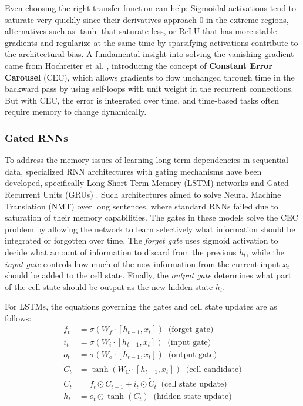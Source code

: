 Even choosing the right transfer function can help: Sigmoidal activations tend to saturate very quickly since their derivatives approach $0$ in the extreme regions, alternatives such as $\tanh$ that
saturate less, or ReLU that has more stable gradients and regularize at the same time by sparsifying activations \cite{pmlr-v15-glorot11a} contribute to the architectural bias.
\newline
A fundamental insight into solving the vanishing gradient came from Hochreiter et al. \cite{article}, introducing the concept of \textbf{Constant Error Carousel} (CEC),
which allows gradients to flow unchanged through time in the backward pass by using self-loops with unit weight in the recurrent connections.
But with CEC, the error is integrated over time, and time-based tasks often require memory to change dynamically.
\subsubsection{Gated RNNs}
To address the memory issues of learning long-term dependencies in sequential data, 
specialized RNN architectures with gating mechanisms have been developed, specifically
Long Short-Term Memory (LSTM) networks \cite{article} and Gated Recurrent Units (GRUs) \cite{cho2014properties}.
Such architectures aimed to solve Neural Machine Translation (NMT) over long sentences, where standard RNNs failed due to saturation of their memory capabilities.
The gates in these models solve the CEC problem by allowing the network to learn selectively what information should be integrated or forgotten over time.
\newline
The \textit{forget gate} uses sigmoid activation to decide what amount of information to discard from the previous $h_t$, while
the \textit{input gate} controls how much of the new information from the current input $x_t$ should be added to the cell state.
Finally, the \textit{output gate} determines what part of the cell state should be output as the new hidden state $h_t$.

For LSTMs, the equations governing the gates and cell state updates are as follows:
\begin{equation}
    \begin{split}
        f_t &= \sigma(W_f \cdot [h_{t-1}, x_t]) \;\; \text{(forget gate)}\\ 
        i_t &= \sigma(W_i \cdot [h_{t-1}, x_t]) \;\; \text{(input gate)}\\
        o_t &= \sigma(W_o \cdot [h_{t-1}, x_t]) \;\; \text{(output gate)}\\
        \tilde{C}_t &= \tanh(W_C \cdot [h_{t-1}, x_t]) \;\; \text{(cell candidate)}\\
        C_t &= f_t \odot C_{t-1} + i_t \odot \tilde{C}_t \;\; \text{(cell state update)}\\
        h_t &= o_t \odot \tanh(C_t) \;\; \text{(hidden state update)}
    \end{split}
\end{equation}

